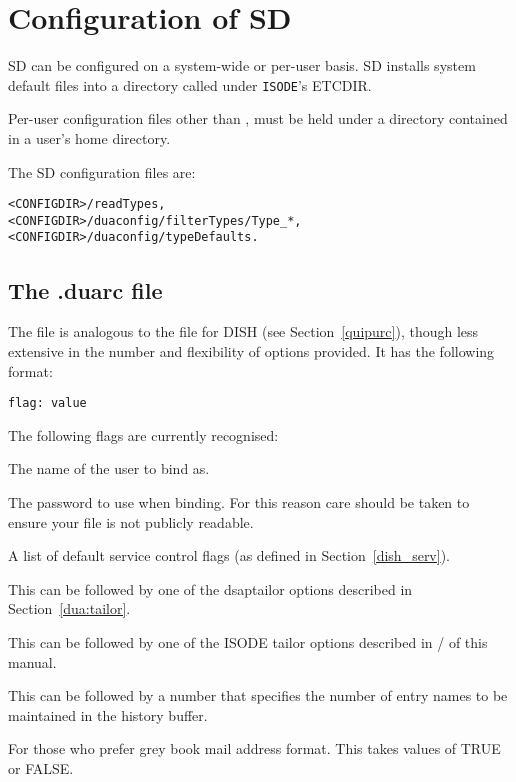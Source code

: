 \section {Configuration of SD}

SD can be configured on a system-wide or per-user basis.
SD installs system default files into a directory called 
under \verb+ISODE+'s ETCDIR.

Per-user configuration files other than ,
must be held under a directory  
contained in a user's home directory.

The SD configuration files are: 
\begin{verbatim}
<CONFIGDIR>/readTypes,
<CONFIGDIR>/duaconfig/filterTypes/Type_*,
<CONFIGDIR>/duaconfig/typeDefaults.
\end{verbatim}

\subsection {The .duarc file}

The  file is analogous to the  file for DISH
(see Section~\ref{quipurc}),
though less extensive in the number and flexibility of options provided.
It has the following format:

\begin{verbatim}
flag: value
\end{verbatim}

The following flags are currently recognised:

\begin{describe}

\item [\verb+username+:] The name of the user to bind as.

\item [\verb+password+:] The password to use when binding. For this reason care
should be taken to ensure your  file is not publicly readable.

\item [\verb+service+:] A list of default service control flags
(as defined in Section~\ref{dish_serv}).

\item [\verb+dsap+:] This can be followed by one of the dsaptailor options
described in Section~\ref{dua:tailor}.

\item [\verb+isode+:]
This can be followed by one of the ISODE tailor options
described in \volone/ of this manual.

\item [\verb+history+:]
This can be followed by a number that specifies the number of entry names
to be maintained in the history buffer.

\item [\verb+prefergreybook+:]
For those who prefer grey book mail address format.
This takes values of TRUE or FALSE.

\end{describe}

